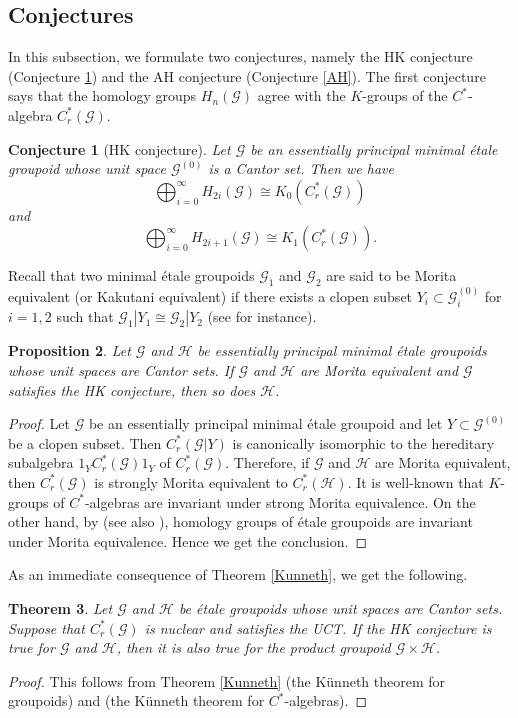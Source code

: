 \documentclass[11pt]{article}
\newtheorem{theorem}{Theorem}[section]
\newtheorem{proposition}[theorem]{Proposition}
\newtheorem{conjecture}[theorem]{Conjecture}
\theoremstyle{definition}
\numberwithin{equation}{section}
\newcommand{\G}{\mathcal{G}}
\renewcommand{\H}{\mathcal{H}}
\begin{document}
\subsection{Conjectures}

In this subsection, we formulate two conjectures, 
namely the HK conjecture (Conjecture \ref{HK}) and 
the AH conjecture (Conjecture \ref{AH}). 
The first conjecture says that 
the homology groups $H_n(\G)$ agree with 
the $K$-groups of the $C^*$-algebra $C^*_r(\G)$. 

\begin{conjecture}[HK conjecture]\label{HK}
Let $\G$ be an essentially principal minimal \'etale groupoid 
whose unit space $\G^{(0)}$ is a Cantor set. 
Then we have 
\[
\bigoplus_{i=0}^\infty H_{2i}(\G)\cong K_0(C^*_r(\G))
\]
and 
\[
\bigoplus_{i=0}^\infty H_{2i+1}(\G)\cong K_1(C^*_r(\G)). 
\]
\end{conjecture}

Recall that 
two minimal \'etale groupoids $\G_1$ and $\G_2$ are said to be 
Morita equivalent (or Kakutani equivalent) 
if there exists a clopen subset $Y_i\subset\G_i^{(0)}$ for $i=1,2$ 
such that $\G_1|Y_1\cong\G_2|Y_2$ 
(see \cite[Definition 4.1]{M12PLMS} for instance). 

\begin{proposition}
Let $\G$ and $\H$ be essentially principal minimal \'etale groupoids 
whose unit spaces are Cantor sets. 
If $\G$ and $\H$ are Morita equivalent and 
$\G$ satisfies the HK conjecture, then so does $\H$. 
\end{proposition}
\begin{proof}
Let $\G$ be an essentially principal minimal \'etale groupoid 
and let $Y\subset\G^{(0)}$ be a clopen subset. 
Then $C^*_r(\G|Y)$ is canonically isomorphic to 
the hereditary subalgebra $1_YC^*_r(\G)1_Y$ of $C^*_r(\G)$. 
Therefore, if $\G$ and $\H$ are Morita equivalent, then 
$C^*_r(\G)$ is strongly Morita equivalent to $C^*_r(\H)$. 
It is well-known that 
$K$-groups of $C^*$-algebras are invariant under strong Morita equivalence. 
On the other hand, 
by \cite[Corollary 4.6]{CM00crelle} (see also \cite[Theorem 4.8]{M12PLMS}), 
homology groups of \'etale groupoids are invariant under Morita equivalence. 
Hence we get the conclusion. 
\end{proof}

As an immediate consequence of Theorem \ref{Kunneth}, 
we get the following. 

\begin{theorem}\label{HKforproduct}
Let $\G$ and $\H$ be \'etale groupoids 
whose unit spaces are Cantor sets. 
Suppose that $C^*_r(\G)$ is nuclear and satisfies the UCT. 
If the HK conjecture is true for $\G$ and $\H$, 
then it is also true for the product groupoid $\G\times\H$. 
\end{theorem}
\begin{proof}
This follows from Theorem \ref{Kunneth} 
(the K\"unneth theorem for groupoids) and 
\cite[Theorem 23.1.3]{Btext} 
(the K\"unneth theorem for $C^*$-algebras). 
\end{proof}
\end{document}
